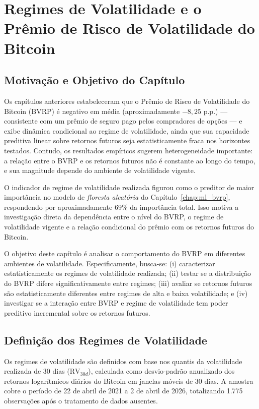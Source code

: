 \chapter{Regimes de Volatilidade e o Prêmio de Risco de Volatilidade do Bitcoin}
\label{chap:regimes}

\section{Motivação e Objetivo do Capítulo}
\label{sec:cap9_motivacao}

Os capítulos anteriores estabeleceram que o Prêmio de Risco de Volatilidade do Bitcoin
(BVRP) é negativo em média (aproximadamente $-8{,}25$ p.p.) --- consistente com um
prêmio de seguro pago pelos compradores de opções --- e exibe dinâmica condicional ao
regime de volatilidade, ainda que sua capacidade preditiva linear sobre retornos
futuros seja estatisticamente fraca nos horizontes testados. Contudo, os resultados empíricos sugerem
heterogeneidade importante: a relação entre o BVRP e os retornos futuros não é constante
ao longo do tempo, e sua magnitude depende do ambiente de volatilidade vigente.

O indicador de regime de volatilidade realizada figurou como o preditor de maior
importância no modelo de \textit{floresta aleatória} do Capítulo~\ref{chap:ml_bvrp},
respondendo por aproximadamente 69\% da importância total. Isso motiva a investigação
direta da dependência entre o nível do BVRP, o regime de volatilidade
vigente e a relação condicional do prêmio com os retornos futuros do Bitcoin.

O objetivo deste capítulo é analisar o comportamento do BVRP em diferentes ambientes
de volatilidade. Especificamente, busca-se: (i) caracterizar estatisticamente os
regimes de volatilidade realizada; (ii) testar se a distribuição do BVRP difere
significativamente entre regimes; (iii) avaliar se retornos futuros são estatisticamente
diferentes entre regimes de alta e baixa volatilidade; e (iv) investigar se a
interação entre BVRP e regime de volatilidade tem poder preditivo incremental sobre
os retornos futuros.

\section{Definição dos Regimes de Volatilidade}
\label{sec:cap9_regimes}

Os regimes de volatilidade são definidos com base nos quantis da volatilidade realizada
de 30 dias ($\text{RV}_{30d}$), calculada como desvio-padrão anualizado dos retornos
logarítmicos diários do Bitcoin em janelas móveis de 30 dias. A amostra cobre o período
de 22 de abril de 2021 a 2 de abril de 2026, totalizando 1.775 observações após
o tratamento de dados ausentes.

